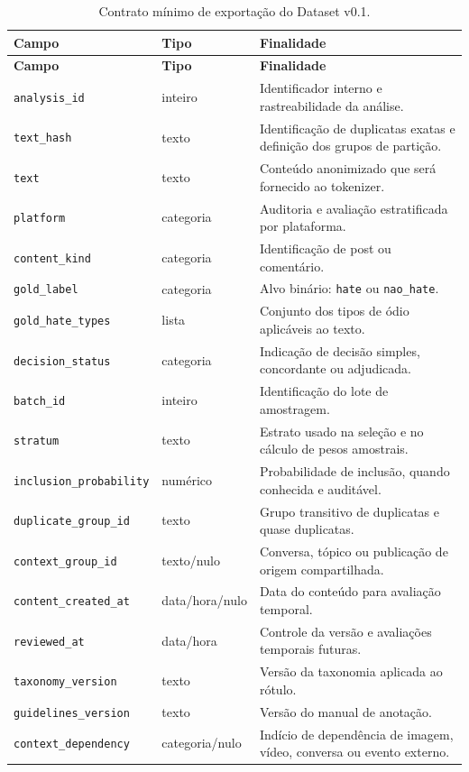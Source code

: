 \begin{longtable}{p{}p{}p{}}
    \caption{Contrato mínimo de exportação do Dataset v0.1.}
    \label{tab:contrato-exportacao} \\
    \toprule
    \textbf{Campo} & \textbf{Tipo} & \textbf{Finalidade} \\
    \midrule
    \endfirsthead
    \toprule
    \textbf{Campo} & \textbf{Tipo} & \textbf{Finalidade} \\
    \midrule
    \endhead
    \texttt{analysis\_id} & inteiro & Identificador interno e rastreabilidade da análise. \\
    \texttt{text\_hash} & texto & Identificação de duplicatas exatas e definição dos grupos de partição. \\
    \texttt{text} & texto & Conteúdo anonimizado que será fornecido ao tokenizer. \\
    \texttt{platform} & categoria & Auditoria e avaliação estratificada por plataforma. \\
    \texttt{content\_kind} & categoria & Identificação de post ou comentário. \\
    \texttt{gold\_label} & categoria & Alvo binário: \texttt{hate} ou \texttt{nao\_hate}. \\
    \texttt{gold\_hate\_types} & lista & Conjunto dos tipos de ódio aplicáveis ao texto. \\
    \texttt{decision\_status} & categoria & Indicação de decisão simples, concordante ou adjudicada. \\
    \texttt{batch\_id} & inteiro & Identificação do lote de amostragem. \\
    \texttt{stratum} & texto & Estrato usado na seleção e no cálculo de pesos amostrais. \\
    \texttt{inclusion\_probability} & numérico & Probabilidade de inclusão, quando conhecida e auditável. \\
    \texttt{duplicate\_group\_id} & texto & Grupo transitivo de duplicatas e quase duplicatas. \\
    \texttt{context\_group\_id} & texto/nulo & Conversa, tópico ou publicação de origem compartilhada. \\
    \texttt{content\_created\_at} & data/hora/nulo & Data do conteúdo para avaliação temporal. \\
    \texttt{reviewed\_at} & data/hora & Controle da versão e avaliações temporais futuras. \\
    \texttt{taxonomy\_version} & texto & Versão da taxonomia aplicada ao rótulo. \\
    \texttt{guidelines\_version} & texto & Versão do manual de anotação. \\
    \texttt{context\_dependency} & categoria/nulo & Indício de dependência de imagem, vídeo, conversa ou evento externo. \\
    \bottomrule
\end{longtable}

